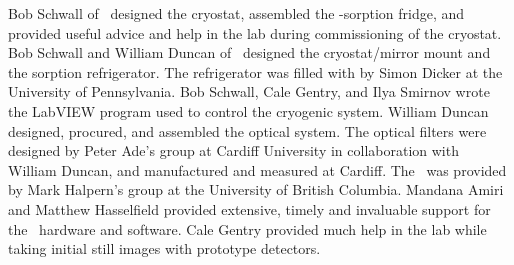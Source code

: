 Bob Schwall of \NIST\ designed the cryostat, assembled the -sorption fridge, and provided useful advice and help in the lab during commissioning of the cryostat.
Bob Schwall and William Duncan of \NIST\ designed the cryostat/mirror mount and the  sorption refrigerator.
The refrigerator was filled with  by Simon Dicker at the University of Pennsylvania.
Bob Schwall, Cale Gentry, and Ilya Smirnov wrote the LabVIEW program used to control the cryogenic system.
William Duncan designed, procured, and assembled the optical system.
The optical filters were designed by Peter Ade's group at Cardiff University in collaboration with William Duncan, and manufactured and measured at Cardiff.
The \MCE\ was provided by Mark Halpern's group at the University of British Columbia.
Mandana Amiri and Matthew Hasselfield provided extensive, timely and invaluable support for the \MCE\ hardware and software.
Cale Gentry provided much help in the lab while taking initial still images with prototype detectors.

